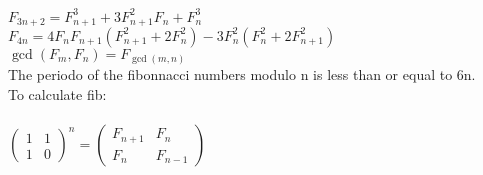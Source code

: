 \documentclass[10pt,letterpaper,twocolumn,twosided]{article}
\begin{document}
$F_{3n+2} = F_{n+1}^3 + 3 F_{n+1}^2F_n + F_n^3 \,$\\

$F_{4n} = 4F_nF_{n+1}(F_{n+1}^2 + 2F_n^2) - 3F_n^2(F_n^2 + 2F_{n+1}^2) \,$\\

$\gcd(F_m,F_n) = F_{\gcd(m,n)}\,$\\

The periodo of the fibonnacci numbers modulo n is less than or equal to 6n.\\

To calculate fib:\\\\

${\begin{pmatrix} 1 & 1 \\ 1 & 0 \end{pmatrix}}^{n} = \begin{pmatrix} F_{n+1} & F_{n} \\ F_{n} & F_{n-1} \end{pmatrix}$
\end{document}
